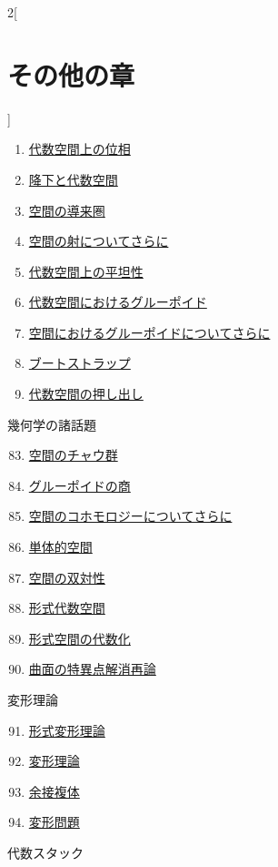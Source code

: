 \begin{multicols}{2}[\section{その他の章}]
\begin{enumerate}
\item \hyperref[spaces-topologies-section-phantom]{代数空間上の位相}
\item \hyperref[spaces-descent-section-phantom]{降下と代数空間}
\item \hyperref[spaces-perfect-section-phantom]{空間の導来圏}
\item \hyperref[spaces-more-morphisms-section-phantom]{空間の射についてさらに}
\item \hyperref[spaces-flat-section-phantom]{代数空間上の平坦性}
\item \hyperref[spaces-groupoids-section-phantom]{代数空間におけるグルーポイド}
\item \hyperref[spaces-more-groupoids-section-phantom]{空間におけるグルーポイドについてさらに}
\item \hyperref[bootstrap-section-phantom]{ブートストラップ}
\item \hyperref[spaces-pushouts-section-phantom]{代数空間の押し出し}
\end{enumerate}
幾何学の諸話題
\begin{enumerate}
\setcounter{enumi}{82}
\item \hyperref[spaces-chow-section-phantom]{空間のチャウ群}
\item \hyperref[groupoids-quotients-section-phantom]{グルーポイドの商}
\item \hyperref[spaces-more-cohomology-section-phantom]{空間のコホモロジーについてさらに}
\item \hyperref[spaces-simplicial-section-phantom]{単体的空間}
\item \hyperref[spaces-duality-section-phantom]{空間の双対性}
\item \hyperref[formal-spaces-section-phantom]{形式代数空間}
\item \hyperref[restricted-section-phantom]{形式空間の代数化}
\item \hyperref[spaces-resolve-section-phantom]{曲面の特異点解消再論}
\end{enumerate}
変形理論
\begin{enumerate}
\setcounter{enumi}{90}
\item \hyperref[formal-defos-section-phantom]{形式変形理論}
\item \hyperref[defos-section-phantom]{変形理論}
\item \hyperref[cotangent-section-phantom]{余接複体}
\item \hyperref[examples-defos-section-phantom]{変形問題}
\end{enumerate}
代数スタック

\end{multicols}
